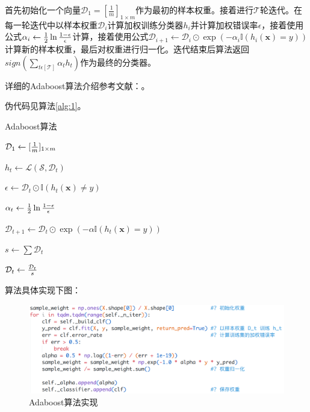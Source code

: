 \documentclass{paper}
\begin{document}
首先初始化一个向量$\mathcal{D}_1 = [\frac{1}{m}]_{1 \times m}$作为最初的样本权重。接着进行$\mathcal{T}$轮迭代。在每一轮迭代中以样本权重$\mathcal{D}_i$计算加权训练分类器$h_i$并计算加权错误率$\epsilon$，接着使用公式$\alpha_{i} \leftarrow {1 \over 2} \ln {1-\epsilon \over \epsilon}$计算，接着使用公式$\mathcal{D}_{i+1} \leftarrow \mathcal{D}_i \odot \exp(-\alpha_i \mathbb{I}(h_i(\mathbf{x}) = y))$计算新的样本权重，最后对权重进行归一化。迭代结束后算法返回$sign(\sum_{t \epsilon [\mathcal{T}]}{\alpha}_t h_t)$作为最终的分类器。

	    详细的Adaboost算法介绍参考文献：\cite{ref1}。

	    伪代码见算法\ref{alg:1}。

	    \newpage

		\begin{algorithm}[H]
			\label{alg:1}
			\SetAlgoLined
			\caption{Adaboost算法}
			
			
			$\mathcal{D}_1 \leftarrow [{1 \over m}]_{1 \times m}$  
			
			{
                $h_t \leftarrow \mathcal{L}(\mathcal{S},\mathcal{D}_t)$   \label{algpart:1}

				$\epsilon \leftarrow \mathcal{D}_t \odot \mathbb{I}(h_t(\mathbf{x}) \neq y)$  \label{algpart:2}

				 \label{algpart:4}

				$\alpha_{t} \leftarrow {1 \over 2} \ln {1-\epsilon \over \epsilon}$

				$\mathcal{D}_{t+1} \leftarrow \mathcal{D}_t \odot \exp(-\alpha \mathbb{I}(h_t(\mathbf{x}) = y))$

				$s \leftarrow \sum \mathcal{D}_t$

				$\mathcal{D}_t \leftarrow {\mathcal{D}_t \over s}$ 
			}


            \label{algpart:3}
	  \end{algorithm}

算法具体实现下图：
\begin{figure}[H]
    \centering
    \includegraphics[scale=0.35, frame]{images/adaboost.png}
    \caption{Adaboost算法实现}
\end{figure}
\end{document}
